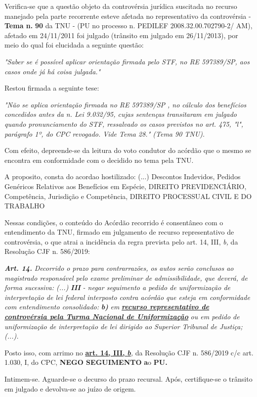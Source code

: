 \documentclass[12pt]{article}
\begin{document}
\justifying
\noindent Verifica-se que a questão objeto da controvérsia jurídica suscitada no recurso manejado pela parte recorrente esteve afetada no representativo da controvérsia - \textbf{Tema n. }\textbf{90} da TNU - (PU no processo n. PEDILEF 2008.32.00.702790-2/ AM),  afetado em 24/11/2011 foi julgado (trânsito em julgado em 26/11/2013), por meio do qual foi elucidada a seguinte questão:

\noindent \textit{"Saber se é possível aplicar orientação firmada pelo STF, no RE 597389/SP, aos casos onde já há coisa julgada."}

\noindent Restou firmada a seguinte tese:

\noindent \textit{"Não se aplica orientação firmada no RE 597389/SP , no cálculo dos benefícios concedidos antes da n. Lei 9.032/95, cujas sentenças transitaram em julgado quando pronunciamento do STF, ressalvado os casos previstos no art. 475, "l", parágrafo 1º, do CPC revogado. Vide Tema 28." (Tema 90 TNU).}

\noindent Com efeito, depreende-se da leitura do voto condutor do acórdão que o mesmo se encontra em conformidade com o decidido no  tema pela TNU.

\noindent A proposito, consta do acordao hostilizado: (...) Descontos Indevidos, Pedidos Genéricos Relativos aos Benefícios em Espécie, DIREITO PREVIDENCIÁRIO, Competência, Jurisdição e Competência, DIREITO PROCESSUAL CIVIL E DO TRABALHO

\noindent Nessas condições, o conteúdo do Acórdão recorrido é consentâneo com o entendimento da TNU, firmado em julgamento de recurso representativo de controvérsia, o que atrai a incidência da regra prevista pelo art. 14, III, \textit{b,} da Resolução CJF n. 586/2019:

\noindent \textit{\textbf{Art. 14.}}\textit{ Decorrido o prazo para contrarrazões, os autos serão conclusos ao magistrado responsável pelo exame preliminar de admissibilidade, que deverá, de forma sucessiva: (...) }\textit{\textbf{III }}\textit{- negar seguimento a pedido de uniformização de interpretação de lei federal interposto contra acórdão que esteja em conformidade com entendimento consolidado: }\textit{\textbf{b)}}\textit{ em }\uline{\textit{\textbf{recurso representativo de controvérsia pela Turma Nacional de Uniformização}}}\textit{ ou em pedido de uniformização de interpretação de lei dirigido ao Superior Tribunal de Justiça;(...).}

\noindent Posto isso, com arrimo no \uline{\textbf{art. 14, III, }}\uline{\textit{\textbf{b}}}\textit{,} da Resolução CJF n. 586/2019 c/c art. 1.030, I, do CPC, \textbf{NEGO SEGUIMENTO }\textbf{a}o\textbf{ PU}\textbf{.}

\noindent Intimem-se. Aguarde-se o decurso do prazo recursal. Após, certifique-se o trânsito em julgado e devolva-se ao juízo de origem.
\end{document}
